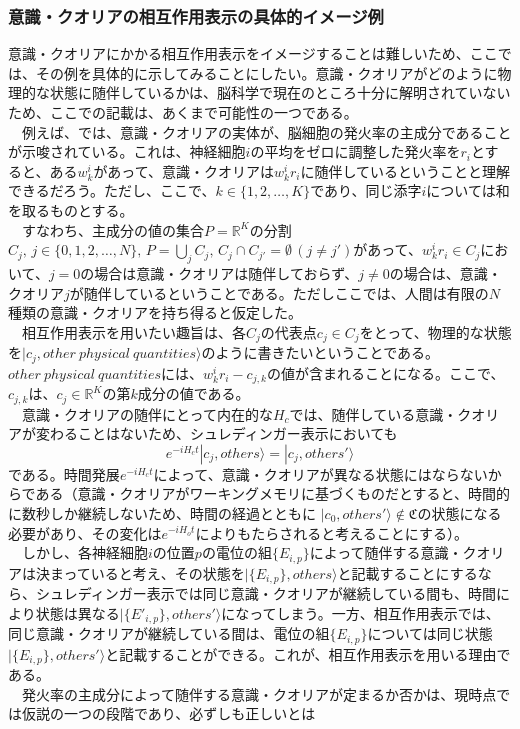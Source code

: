 \subsubsection{意識・クオリアの相互作用表示の具体的イメージ例}
意識・クオリアにかかる相互作用表示をイメージすることは難しいため、ここでは、その例を具体的に示してみることにしたい。意識・クオリアがどのように物理的な状態に随伴しているかは、脳科学で現在のところ十分に解明されていないため、ここでの記載は、あくまで可能性の一つである。\\
　例えば、\cite{Murray_2016}では、意識・クオリアの実体が、脳細胞の発火率の主成分であることが示唆されている。これは、神経細胞$i$の平均をゼロに調整した発火率を$r_i$とすると、ある$w_k^i$があって、意識・クオリアは$w_k^ir_i$に随伴しているということと理解できるだろう。ただし、ここで、$k\in\{1,2,\ldots,K\}$であり、同じ添字$i$については和を取るものとする。\\
　すなわち、主成分の値の集合$P=\mathbb{R}^K$の分割$C_j,\,j\in\{0,1,2,\ldots,N\},\, P=\bigcup_j C_j,\, C_j \cap C_{j'}=\emptyset \, (j \neq j')$があって、$w_k^ir_i \in C_j$において、$j=0$の場合は意識・クオリアは随伴しておらず、$j \neq 0$の場合は、意識・クオリア$j$が随伴しているということである。ただしここでは、人間は有限の$N$種類の意識・クオリアを持ち得ると仮定した。\\
　相互作用表示を用いたい趣旨は、各$C_j$の代表点$c_j \in C_j$をとって、物理的な状態を$|c_j,other \ physical \ quantities \rangle$のように書きたいということである。$other \ physical \  quantities$には、$w_k^ir_i - c_{j,k}$の値が含まれることになる。ここで、$c_{j,k}$は、$c_j \in \mathbb{R}^K$の第$k$成分の値である。\\
　意識・クオリアの随伴にとって内在的な$H_c$では、随伴している意識・クオリアが変わることはないため、シュレディンガー表示においても
\begin{equation}
  e^{-iH_ct}|c_j,others \rangle = |c_j,others' \rangle 
\end{equation}
である。時間発展$e^{-iH_ct}$によって、意識・クオリアが異なる状態にはならないからである（意識・クオリアがワーキングメモリに基づくものだとすると、時間的に数秒しか継続しないため、時間の経過とともに $|c_0,others' \rangle \notin \mathfrak{C}$の状態になる必要があり、その変化は$e^{-iH_ot}$によりもたらされると考えることにする）。\\
　しかし、各神経細胞$i$の位置$p$の電位の組$\{E_{i,p}\}$によって随伴する意識・クオリアは決まっていると考え、その状態を$|\{ E_{i,p}\},others \rangle$と記載することにするなら、シュレディンガー表示では同じ意識・クオリアが継続している間も、時間により状態は異なる$|\{ E'_{i,p}\},others' \rangle$になってしまう。一方、相互作用表示では、同じ意識・クオリアが継続している間は、電位の組$\{E_{i,p}\}$については同じ状態$|\{ E_{i,p}\},others' \rangle$と記載することができる。これが、相互作用表示を用いる理由である。\\
　発火率の主成分によって随伴する意識・クオリアが定まるか否かは、現時点では仮説の一つの段階であり、必ずしも正しいとは